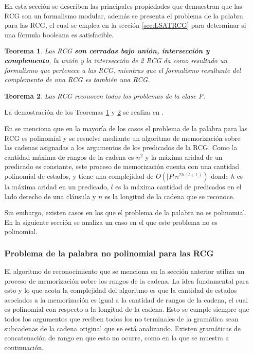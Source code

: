 \documentclass{article}
\newtheorem{theorem}{Teorema}
\begin{document}
En esta sección se describen las principales propiedades que demuestran que las RCG son un formalismo
modular, además se presenta el problema de la palabra
para las RCG, el cual se emplea en la sección \ref{sec:LSATRCG} para determinar si una fórmula booleana es satisfacible.

\begin{theorem}
    \label{teo:RCGset}
    Las RCG \textbf{son cerradas bajo unión, intersección y complemento}, la unión y la intersección de 2 RCG da como resultado un formalismo que pertenece a las RCG, mientras
    que el formalismo resultante del complemento de una RCG es también una RCG.
\end{theorem}

\begin{theorem}
    \label{teo:RCGrecP}
    Las RCG reconocen todos los problemas de la clase P.
\end{theorem}

La demostración de los Teoremas \ref{teo:RCGset} y \ref{teo:RCGrecP} se realiza en \cite{mainRCGBib}.

En \cite{mainRCGBib} se menciona que en la mayoría de los casos el problema de la palabra para las RCG es polinomial y se resuelve mediante un algoritmo de memorización sobre las cadenas asignadas a los argumentos de los predicados de la RCG.  Como la cantidad máxima de rangos de la cadena es $n^2$ y la máxima aridad de un predicado es constante, este proceso de memorización cuenta con una cantidad polinomial de estados, y tiene una complejidad de $O(|P|n^{2h(l+1)})$ donde $h$ es la máxima aridad en un predicado, $l$ es la máxima cantidad de predicados en el lado derecho de una cláusula y $n$ es la longitud de la cadena que se reconoce.

Sin embargo, existen casos en los que el problema de la palabra no es polinomial. En la siguiente sección se analiza un caso en el que este problema no es polinomial.

\subsubsection{Problema de la palabra no polinomial para las RCG}

El algoritmo de reconocimiento que se menciona en la sección anterior utiliza un proceso de memorización sobre los rangos de la cadena.  La idea fundamental para esto y lo que acota la complejidad del algoritmo es que la cantidad de estados asociados a la memorización es igual a la cantidad de rangos de la cadena, el cual es polinomial con respecto a la longitud de la cadena. Esto se cumple siempre que todos los argumentos que reciben todos los no terminales de la gramática sean subcadenas de la cadena original que se está analizando. Existen gramáticas de concatenación de rango en que esto no ocurre, como en la que se muestra a continuación.
\end{document}
